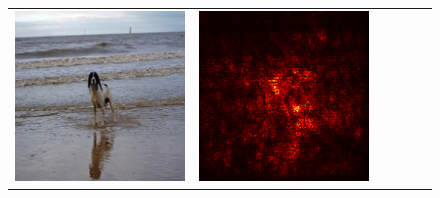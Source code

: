 \documentclass[preprint,12pt]{elsarticle}
\begin{document}
\begin{figure}[p]
\begin{tabular}{cccccc}
  \includegraphics[scale=\scale]{../visualizations/examples/imagenette/resnet18/images/3.png} &
  \includegraphics[scale=\scale]{../visualizations/examples/imagenette/resnet18/saliency_map/3.png} & 

\end{tabular}
\end{figure}
\end{document}
